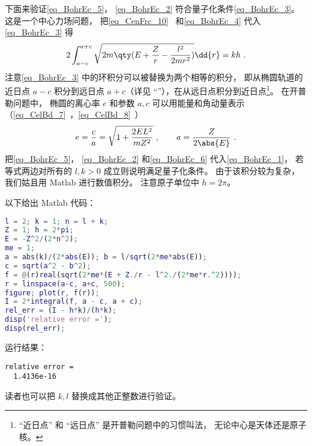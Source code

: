 下面来验证\autoref{eq_BohrEc_5}， \autoref{eq_BohrEc_2} 符合量子化条件\autoref{eq_BohrEc_3}。 这是一个中心力场问题， 把\autoref{eq_CenFrc_10}~ 和\autoref{eq_BohrEc_4}  代入\autoref{eq_BohrEc_3} 得
\begin{equation}\label{eq_BohrEc_1}
2\int_{a-c}^{a+c} \sqrt{2m\qty(E + \frac{Z}{r} - \frac{l^2}{2mr^2})} \dd{r} = kh~.
\end{equation}
注意\autoref{eq_BohrEc_3} 中的环积分可以被替换为两个相等的积分， 即从椭圆轨道的近日点 $a-c$ 积分到远日点 $a+c$（详见 “”），在从远日点积分到近日点\footnote{“近日点” 和 “远日点” 是开普勒问题中的习惯叫法， 无论中心是天体还是原子核。}。 在开普勒问题中， 椭圆的离心率 $e$ 和参数 $a, c$ 可以用能量和角动量表示（\autoref{eq_CelBd_7}~，\autoref{eq_CelBd_8}~）
\begin{equation}\label{eq_BohrEc_6}
e = \frac{c}{a} = \sqrt{1 + \frac{2EL^2}{mZ^2}}~,
\qquad
a = \frac{Z}{2\abs{E}}~.
\end{equation}
把\autoref{eq_BohrEc_5}， \autoref{eq_BohrEc_2} 和\autoref{eq_BohrEc_6} 代入\autoref{eq_BohrEc_1}， 若等式两边对所有的 $l,k > 0$ 成立则说明满足量子化条件。 由于该积分较为复杂， 我们姑且用 Matlab 进行数值积分。%
注意原子单位中 $h = 2\pi$。

以下给出 Matlab 代码：
\begin{lstlisting}[language=matlab]
l = 2; k = 1; n = l + k;
Z = 1; h = 2*pi;
E = -Z^2/(2*n^2);
me = 1;
a = abs(k)/(2*abs(E)); b = l/sqrt(2*me*abs(E));
c = sqrt(a^2 - b^2);
f = @(r)real(sqrt(2*me*(E + Z./r - l^2./(2*me*r.^2))));
r = linspace(a-c, a+c, 500);
figure; plot(r, f(r));
I = 2*integral(f, a - c, a + c);
rel_err = (I - h*k)/(h*k);
disp('relative error =');
disp(rel_err);
\end{lstlisting}
运行结果： 
\begin{lstlisting}[language=matlabC]
relative error =
  1.4136e-16
\end{lstlisting}
读者也可以把 $k, l$ 替换成其他正整数进行验证。
